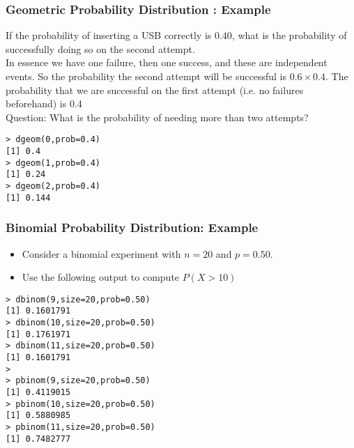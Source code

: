 \begin{frame}[fragile]
\frametitle{Geometric Probability Distribution : Example}

If the probability of inserting a USB correctly is $0.40$, what is the probability of successfully doing so on the second attempt.\\
\bigskip
In essence we have one failure, then one success, and these are independent events. So the probability the second attempt will be successful is $0.6 \times 0.4$. The probability that we are successful on the first attempt (i.e. no failures beforehand) is 0.4\\
\bigskip
Question: What is the probability of needing more than two attempts?
\begin{verbatim}
> dgeom(0,prob=0.4)
[1] 0.4
> dgeom(1,prob=0.4)
[1] 0.24
> dgeom(2,prob=0.4)
[1] 0.144
\end{verbatim}

\end{frame}




\begin{frame}[fragile]
\frametitle{Binomial Probability Distribution: Example}

\begin{itemize}
\item Consider a binomial experiment with $n = 20$ and $p = 0.50$.
\item Use the following output to compute $P(X > 10)$
\end{itemize}
\begin{verbatim}
> dbinom(9,size=20,prob=0.50)
[1] 0.1601791
> dbinom(10,size=20,prob=0.50)
[1] 0.1761971
> dbinom(11,size=20,prob=0.50)
[1] 0.1601791
>
> pbinom(9,size=20,prob=0.50)
[1] 0.4119015
> pbinom(10,size=20,prob=0.50)
[1] 0.5880985
> pbinom(11,size=20,prob=0.50)
[1] 0.7482777
\end{verbatim}
\end{frame}

